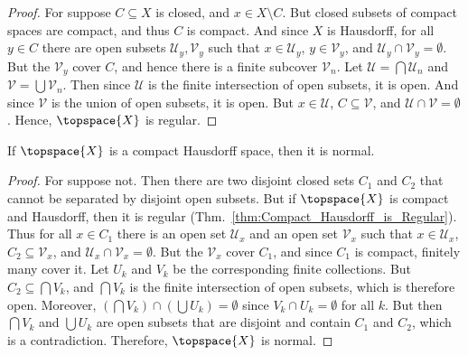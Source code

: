 \documentclass{article}                                                        %
\begin{document}
            \begin{proof}
                For suppose $C\subseteq{X}$ is closed, and $x\in{X}\setminus{C}$.
                But closed subsets of compact spaces are compact, and thus $C$ is
                compact. And since $X$ is Hausdorff, for all $y\in{C}$ there are
                open subsets $\mathcal{U}_{y},\mathcal{V}_{y}$ such that
                $x\in\mathcal{U}_{y}$, $y\in\mathcal{V}_{y}$, and
                $\mathcal{U}_{y}\cap\mathcal{V}_{y}=\emptyset$. But the
                $\mathcal{V}_{y}$ cover $C$, and hence there is a finite subcover
                $\mathcal{V}_{n}$. Let $\mathcal{U}=\bigcap\mathcal{U}_{n}$ and
                $\mathcal{V}=\bigcup\mathcal{V}_{n}$. Then since
                $\mathcal{U}$ is the finite intersection of open subsets, it is
                open. And since $\mathcal{V}$ is the union of open subsets, it is
                open. But $x\in\mathcal{U}$, $C\subseteq\mathcal{V}$, and
                $\mathcal{U}\cap\mathcal{V}=\emptyset$. Hence, $\topspace{X}$ is
                regular.
            \end{proof}
            \begin{theorem}
                \label{thm:Compact_Hausdorff_is_Normal}%
                If $\topspace{X}$ is a compact Hausdorff space, then it is
                normal.
            \end{theorem}
            \begin{proof}
                For suppose not. Then there are two disjoint closed sets $C_{1}$
                and $C_{2}$ that cannot be separated by disjoint open subsets.
                But if $\topspace{X}$ is compact and Hausdorff, then it is
                regular (Thm.~\ref{thm:Compact_Hausdorff_is_Regular}). Thus for
                all $x\in{C}_{1}$ there is an open set $\mathcal{U}_{x}$ and an
                open set $\mathcal{V}_{x}$ such that $x\in\mathcal{U}_{x}$,
                $C_{2}\subseteq\mathcal{V}_{x}$, and
                $\mathcal{U}_{x}\cap\mathcal{V}_{x}=\emptyset$. But the
                $\mathcal{V}_{x}$ cover $C_{1}$, and since $C_{1}$ is compact,
                finitely many cover it. Let $U_{k}$ and $V_{k}$ be the
                corresponding finite collections. But
                $C_{2}\subseteq\bigcap{V}_{k}$, and $\bigcap{V}_{k}$ is the
                finite intersection of open subsets, which is therefore open.
                Moreover, $(\bigcap{V}_{k})\cap(\bigcup{U}_{k})=\emptyset$
                since $V_{k}\cap{U}_{k}=\emptyset$ for all $k$. But then
                $\bigcap{V}_{k}$ and $\bigcup{U}_{k}$ are open subsets that
                are disjoint and contain $C_{1}$ and $C_{2}$, which is a
                contradiction. Therefore, $\topspace{X}$ is normal.
            \end{proof}
\end{document}
